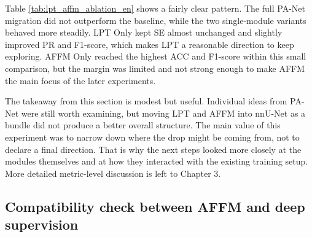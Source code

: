 \documentclass[a4paper,12pt]{article}
\begin{document}
\begin{table}[htbp]
\centering
\caption{Comparison of LPT and AFFM ablation results}
\label{tab:lpt_affm_ablation_en}
\end{table}

Table \ref{tab:lpt_affm_ablation_en} shows a fairly clear pattern. The full PA-Net migration did not outperform the baseline, while the two single-module variants behaved more steadily. LPT Only kept SE almost unchanged and slightly improved PR and F1-score, which makes LPT a reasonable direction to keep exploring. AFFM Only reached the highest ACC and F1-score within this small comparison, but the margin was limited and not strong enough to make AFFM the main focus of the later experiments.

The takeaway from this section is modest but useful. Individual ideas from PA-Net were still worth examining, but moving LPT and AFFM into nnU-Net as a bundle did not produce a better overall structure. The main value of this experiment was to narrow down where the drop might be coming from, not to declare a final direction. That is why the next steps looked more closely at the modules themselves and at how they interacted with the existing training setup. More detailed metric-level discussion is left to Chapter 3.

\subsection{Compatibility check between AFFM and deep supervision}
\end{document}
